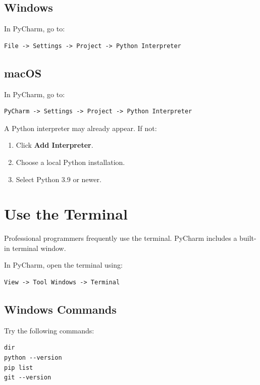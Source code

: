 \documentclass[11pt]{article}
\begin{document}
\subsection*{Windows}

In PyCharm, go to:

\begin{lstlisting}[style=terminal]
File -> Settings -> Project -> Python Interpreter
\end{lstlisting}

\subsection*{macOS}

In PyCharm, go to:

\begin{lstlisting}[style=terminal]
PyCharm -> Settings -> Project -> Python Interpreter
\end{lstlisting}

A Python interpreter may already appear. If not:

\begin{enumerate}
    \item Click \textbf{Add Interpreter}.
    \item Choose a local Python installation.
    \item Select Python 3.9 or newer.
\end{enumerate}

\section{Use the Terminal}

Professional programmers frequently use the terminal. PyCharm includes a built-in terminal window.

In PyCharm, open the terminal using:

\begin{lstlisting}[style=terminal]
View -> Tool Windows -> Terminal
\end{lstlisting}

\subsection*{Windows Commands}

Try the following commands:

\begin{lstlisting}[style=terminal]
dir
python --version
pip list
git --version
\end{lstlisting}
\end{document}
